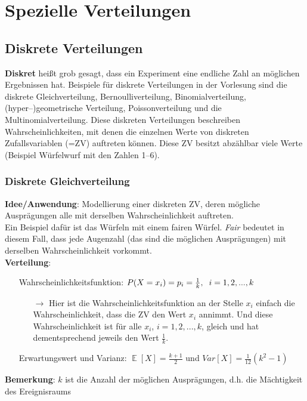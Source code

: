 \documentclass[a4paper]{article}
\DeclareMathOperator*{\E}{\mathbb{E}}
\begin{document}
\section{Spezielle Verteilungen} \label{sec:Distr}

\subsection{Diskrete Verteilungen} \label{sec:discretedistr}
\textbf{Diskret} heißt grob gesagt, dass ein Experiment eine endliche Zahl an möglichen Ergebnissen hat. Beispiele für diskrete Verteilungen in der Vorlesung sind die diskrete Gleichverteilung, Bernoulliverteilung, Binomialverteilung, (hyper--)geometrische Verteilung, Poissonverteilung und die Multinomialverteilung. Diese diskreten Verteilungen beschreiben Wahrscheinlichkeiten, mit denen die einzelnen Werte von diskreten Zufallsvariablen (=ZV) auftreten können. Diese ZV besitzt abzählbar viele Werte (Beispiel Würfelwurf mit den Zahlen 1--6).


\subsubsection{Diskrete Gleichverteilung} \label{sec:duni}

\noindent \textbf{Idee/Anwendung}: Modellierung einer diskreten ZV, deren mögliche Ausprägungen alle mit derselben Wahrscheinlichkeit auftreten. \\

\noindent Ein Beispiel dafür ist das Würfeln mit einem fairen Würfel. \textit{Fair} bedeutet in diesem Fall, dass jede Augenzahl (das sind die möglichen Ausprägungen) mit derselben Wahrscheinlichkeit vorkommt. \\

\noindent \textbf{Verteilung}: 
\begin{itemize}
\item[] Wahrscheinlichkeitsfunktion: $P(X=x_i)=p_i=\frac{1}{k}, \hspace{0.2cm} i=1,2,...,k$
	\begin{itemize}
	\item[$\rightarrow$] Hier ist die Wahrscheinlichkeitsfunktion an der Stelle $x_i$ einfach die Wahrscheinlichkeit, dass die ZV den Wert $x_i$ annimmt. Und diese Wahrscheinlichkeit ist für alle $x_i$, $i=1,2,...,k$, gleich und hat dementsprechend jeweils den Wert $\frac{1}{k}$.
	\end{itemize}
\item[] Erwartungswert und Varianz: $\E[X]=\frac{k+1}{2}$ und $Var[X]=\frac{1}{12}(k^2-1)$
\end{itemize}
\noindent \textbf{Bemerkung}: $k$ ist die Anzahl der möglichen Ausprägungen, d.h. die Mächtigkeit des Ereignisraums
\end{document}
